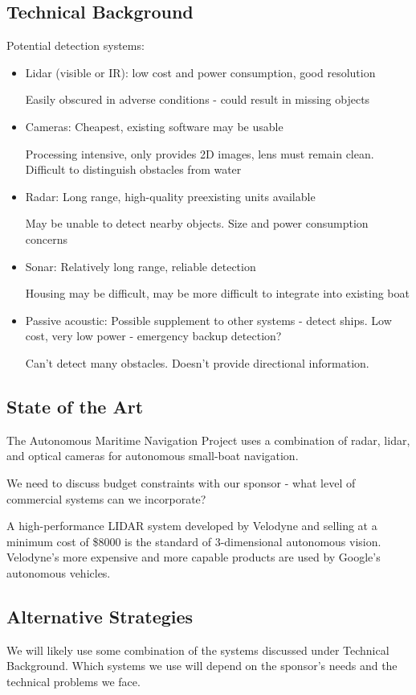 \subsection{\label{sec:intro:technical-background}Technical Background}
Potential detection systems:
\begin{itemize}

\item Lidar (visible or IR): 
low cost and power consumption, good resolution

Easily obscured in adverse conditions - could result in missing objects

\item Cameras: 
Cheapest, existing software may be usable

Processing intensive, only provides 2D images, lens must remain clean.  Difficult to distinguish obstacles from water

\item Radar:
Long range, high-quality preexisting units available

May be unable to detect nearby objects.  Size and power consumption concerns

\item Sonar:
Relatively long range, reliable detection

Housing may be difficult, may be more difficult to integrate into existing boat

\item Passive acoustic:
Possible supplement to other systems - detect ships.  Low cost, very low power - emergency backup detection?

Can't detect many obstacles.  Doesn't provide directional information.
\end{itemize}

\subsection{\label{sec:intro:commercial}State of the Art}
The Autonomous Maritime Navigation Project uses a combination of radar, lidar, and optical cameras for autonomous small-boat navigation.

We need to discuss budget constraints with our sponsor - what level of commercial systems can we incorporate?

A high-performance LIDAR system developed by Velodyne and selling at a minimum cost of \$8000 is the standard of 3-dimensional autonomous vision. Velodyne's more expensive and more capable products are used by Google's autonomous vehicles.

\subsection{\label{sec:intro:alternatives}Alternative Strategies}
We will likely use some combination of the systems discussed under Technical Background.  Which systems we use will depend on the sponsor's needs and the technical problems we face.

